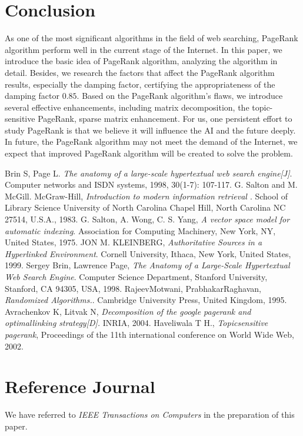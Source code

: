 \documentclass[lettersize,journal,12pt,conference]{IEEEtran}
\begin{document}
\section{Conclusion}

As one of the most significant algorithms in the field of web searching, PageRank algorithm perform well in the current stage of the Internet. In this paper, we introduce the basic idea of PageRank algorithm, analyzing the algorithm in detail. Besides, we research the factors that affect the PageRank algorithm results, especially the damping factor, certifying the appropriateness of the damping factor $0.85$. Based on the PageRank algorithm's flaws, we introduce several effective enhancements, including matrix decomposition, the topic-sensitive PageRank, sparse matrix enhancement. For us, one persistent effort to study PageRank is that we believe it will influence the AI and the future deeply. In future, the PageRank algorithm may not meet the demand of the Internet, we expect that improved PageRank algorithm will be created to solve the problem.

\begin{thebibliography}{1}
	Brin S, Page L. {\it{The anatomy of a large-scale hypertextual web search engine[J]}}. Computer networks and ISDN systems, 1998, 30(1-7): 107-117.
	G. Salton and M. McGill. McGraw-Hill, {\it{Introduction to modern information retrieval }}. School of Library Science University of North Carolina Chapel Hill, North Carolina NC 27514, U.S.A., 1983.
	G. Salton, A. Wong, C. S. Yang, {\it{A vector space model for automatic indexing}}. Association for Computing Machinery, New York, NY, United States, 1975.
	JON M. KLEINBERG, {\it{Authoritative Sources in a Hyperlinked Environment}}. Cornell University, Ithaca, New York, United States, 1999.
	Sergey Brin, Lawrence Page, {\it{The Anatomy of a Large-Scale Hypertextual Web
				Search Engine}}. Computer Science Department, Stanford University, Stanford, CA 94305, USA, 1998.
	RajeevMotwani, PrabhakarRaghavan, {\it{Randomized Algorithms.}}. Cambridge University Press, United Kingdom, 1995.
	Avrachenkov K, Litvak N, {\it{Decomposition of the google pagerank and optimallinking strategy[D].}} INRIA, 2004.
	Haveliwala T H., {\it{Topicsensitive pagerank}}, Proceedings of the 11th international conference on World Wide Web, 2002.

\end{thebibliography}

\section*{Reference Journal}

We have referred to 
{\it{IEEE Transactions on Computers}} in the preparation of this paper.
\end{document}
